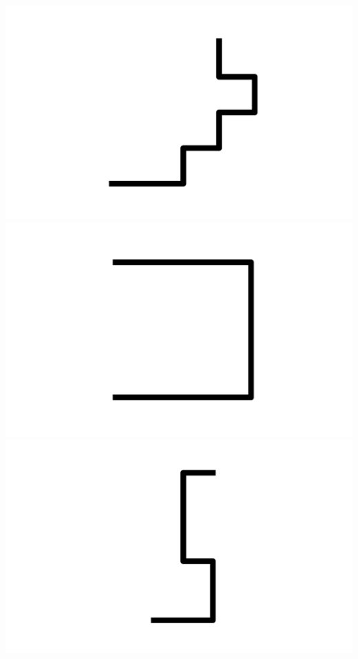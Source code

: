 \documentclass[]{report}
\begin{document}
\includegraphics[scale=.1]{pictures/21/state_cluster_shapes_199.pdf} 
\includegraphics[scale=.1]{pictures/21/state_cluster_shapes_200.pdf} 
\includegraphics[scale=.1]{pictures/21/state_cluster_shapes_201.pdf} 
\end{document}
